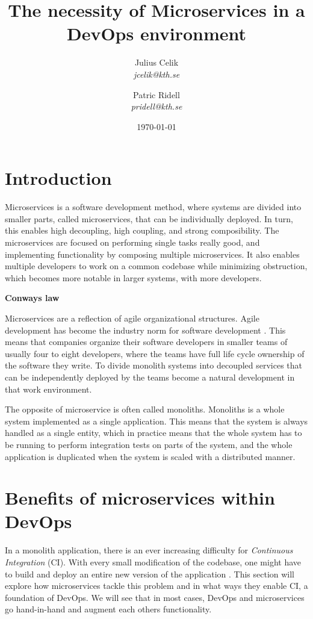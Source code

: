 \documentclass{article}
\title{The necessity of Microservices in a DevOps environment}
\author{
{Julius Celik}\\
\textit{
    jcelik@kth.se
} \and {Patric Ridell}\\
\textit{
    pridell@kth.se
}}
\date{\today{}}
\begin{document}
\maketitle


\section{Introduction}
Microservices is a software development method, where systems are divided into smaller parts, called microservices, that can be individually deployed. In turn, this enables high decoupling, high coupling, and strong composibility. The microservices are focused on performing single tasks really good, and implementing functionality by composing multiple microservices. It also enables multiple developers to work on a common codebase while minimizing obstruction, which becomes more notable in larger systems, with more developers.

\textbf{Conways law}

Microservices are a reflection of agile organizational structures. Agile development has become the industry norm for software development \cite{Jeremiah}. This means that companies organize their software developers in smaller teams of usually four to eight developers, where the teams have full life cycle ownership of the software they write. To divide monolith systems into decoupled services that can be independently deployed by the teams become a natural development in that work environment.

The opposite of microservice is often called monoliths. Monoliths is a whole system implemented as a single application. This means that the system is always handled as a single entity, which in practice means that the whole system has to be running to perform integration tests on parts of the system, and the whole application is duplicated when the system is scaled with a distributed manner.



\section{Benefits of microservices within DevOps}
In a monolith application, there is an ever increasing difficulty for \textit{Continuous Integration} (CI). With every small modification of the codebase, one might have to build and deploy an entire new version of the application \cite{Jeremiah}. This section will explore how microservices tackle this problem and in what ways they enable CI, a foundation of DevOps. We will see that in most cases, DevOps and microservices go hand-in-hand and augment each others functionality.
\end{document}
